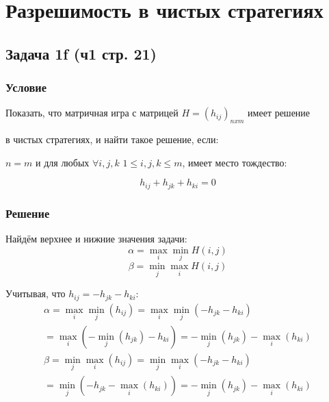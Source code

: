 \documentclass[a4paper,14pt]{extreport}
\begin{document}
\maketitle
\setcounter{page}{2}

\chapter{Разрешимость в чистых стратегиях}
\section{Задача 1f (ч1 стр. 21)}
\subsection{Условие}

Показать, что матричная игра с матрицей $H=(h_{ij})_{nxm}$ имеет решение \par
в чистых стратегиях, и найти такое решение, если: \par 
$n=m$ и для любых $\forall i, j, k$  $1 \leqslant i, j, k \leqslant m$, имеет место тождество: \par
\begin{equation*}
    h_{ij}+h_{jk} + h_{ki} = 0
\end{equation*}

\subsection{Решение}
Найдём верхнее и нижние значения задачи:
\begin{equation}
    \alpha = \max_i\min_jH(i,j)
\end{equation}
\begin{equation}
    \beta = \min_j\max_iH(i,j)
\end{equation}

Учитывая, что $h_{ij}=-h_{jk}-h_{ki}$:
\begin{equation}
\begin{split}
    \alpha = \max_i\min_j(h_{ij}) = \max_i\min_j(-h_{jk} - h_{ki}) \\ = \max_i(-\min_j(h_{jk}) - h_{ki}) = -\min_j(h_{jk}) - \max_i(h_{ki})
\end{split}
\end{equation}
\begin{equation}
\begin{split}
    \beta = \min_j\max_i(h_{ij}) = \min_j\max_i(-h_{jk} - h_{ki}) \\ = \min_j(-h_{jk} -\max_i(h_{ki})) = -\min_j(h_{jk}) - \max_i(h_{ki})
\end{split}
\end{equation}
\end{document}
